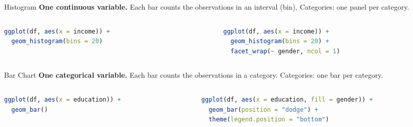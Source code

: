 \documentclass[9pt,aspectratio=169]{beamer}
\begin{document}
\begin{frame}[fragile]{Histogram}
\linespread{1.3}\selectfont
\textbf{One continuous variable.} Each bar counts the observations in an interval (bin). Categories: one panel per category.

\begin{columns}[t]
\begin{column}{0.5\textwidth}
\centering
{}
\begin{lstlisting}[language=R, basicstyle=\ttfamily\scriptsize]
ggplot(df, aes(x = income)) +
  geom_histogram(bins = 20)
\end{lstlisting}
\end{column}
\begin{column}{0.5\textwidth}
\centering
{}
\begin{lstlisting}[language=R, basicstyle=\ttfamily\scriptsize]
ggplot(df, aes(x = income)) +
  geom_histogram(bins = 20) +
  facet_wrap(~ gender, ncol = 1)
\end{lstlisting}
\end{column}
\end{columns}
\end{frame}


\begin{frame}[fragile]{Bar Chart}
\linespread{1.3}\selectfont
\textbf{One categorical variable.} Each bar counts the observations in a category. Categories: one bar per category.

\begin{columns}[t]
\begin{column}{0.5\textwidth}
\centering
{}
\begin{lstlisting}[language=R, basicstyle=\ttfamily\scriptsize]
ggplot(df, aes(x = education)) +
  geom_bar()
\end{lstlisting}
\end{column}
\begin{column}{0.5\textwidth}
\centering
{}
\begin{lstlisting}[language=R, basicstyle=\ttfamily\scriptsize]
ggplot(df, aes(x = education, fill = gender)) +
  geom_bar(position = "dodge") +
  theme(legend.position = "bottom")
\end{lstlisting}
\end{column}
\end{columns}
\end{frame}
\end{document}
